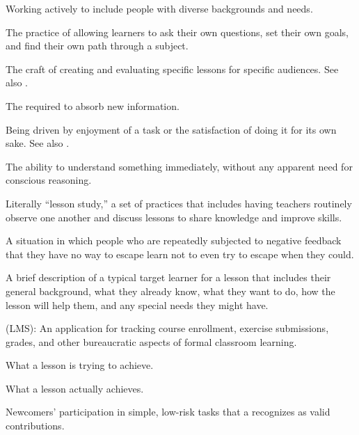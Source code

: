 \begin{description}
 Working actively to include people with
diverse backgrounds and needs.

 The practice of
allowing learners to ask their own questions, set their own goals, and find
their own path through a subject.

 The craft of creating and
evaluating specific lessons for specific audiences. See also
.

 The 
required to absorb new information.

 Being driven by enjoyment
of a task or the satisfaction of doing it for its own sake.  See also
.

 The ability to understand something immediately,
without any apparent need for conscious reasoning.

 Literally ``lesson study,'' a set of
practices that includes having teachers routinely observe one another and
discuss lessons to share knowledge and improve skills.

 A situation in which
people who are repeatedly subjected to negative feedback that they have no way
to escape learn not to even try to escape when they could.

 A brief description of a typical
target learner for a lesson that includes their general background, what they
already know, what they want to do, how the lesson will help them, and any
special needs they might have.

 (LMS): An application for tracking course
enrollment, exercise submissions, grades, and other bureaucratic aspects of
formal classroom learning.

 What a lesson is trying to
achieve.

 What a lesson actually achieves.

 Newcomers' participation in simple, low-risk tasks that a
 recognizes as valid contributions.


\end{description}
